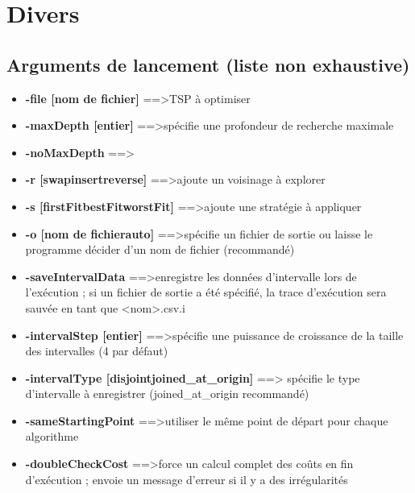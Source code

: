 \documentclass[a4paper,10pt]{report}
\begin{document}
\chapter{Divers}
\section{Arguments de lancement (liste non exhaustive)}

\begin{itemize}
 \item \textbf{-file [nom de fichier]} ==\textgreater TSP à optimiser
 \item \textbf{-maxDepth [entier]} ==\textgreater spécifie une profondeur de
recherche maximale
 \item \textbf{-noMaxDepth} ==\textgreater 
 \item \textbf{-r [swap\textbar insert\textbar reverse]} ==\textgreater  ajoute un voisinage à
explorer
 \item \textbf{-s [firstFit\textbar bestFit\textbar worstFit]} ==\textgreater ajoute une
stratégie à appliquer
 \item \textbf{-o [nom de fichier\textbar auto]} ==\textgreater spécifie un fichier de
sortie ou laisse le programme décider d'un nom de fichier (recommandé)
 \item \textbf{-saveIntervalData} ==\textgreater enregistre les données
d'intervalle lors de l'exécution ; si un fichier de sortie a été spécifié, la
trace d'exécution sera sauvée en tant que \textless nom\textgreater.csv.i
 \item \textbf{-intervalStep [entier]} ==\textgreater spécifie une puissance de
croissance de la taille des intervalles (4 par défaut)
 \item \textbf{-intervalType [disjoint\textbar joined\_at\_origin]} ==\textgreater
spécifie le type d'intervalle à enregistrer (joined\_at\_origin recommandé)
 \item \textbf{-sameStartingPoint} ==\textgreater utiliser le même point de
départ pour chaque algorithme
 \item \textbf{-doubleCheckCost} ==\textgreater force un calcul complet des
coûts en fin d'exécution ; envoie un message d'erreur si il y a des
irrégularités
\end{itemize}
\end{document}

